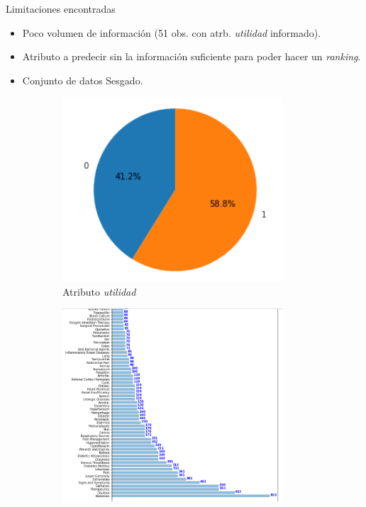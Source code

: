 \documentclass[10pt]{beamer}
\begin{document}
\begin{frame}{Limitaciones encontradas}
  \begin{itemize}
    \item Poco volumen de información (51 obs. con atrb. \textit{utilidad} informado).
    \item Atributo a predecir sin la información suficiente para poder hacer un \textit{ranking}.
    \item Conjunto de datos Sesgado.
  \end{itemize}
  \begin{figure}[!htb]
    \begin{subfigure}[b]{0.45\linewidth}
    	\centering
	    \includegraphics[width=0.9\textwidth]{images/sesgado_1.png}
	    \caption{Atributo \textit{utilidad}}
	\end{subfigure}
	\begin{subfigure}[b]{0.45\linewidth} 
		\centering
		\includegraphics[width=0.9\textwidth]{images/sesgado_2.png}

\end{subfigure}
\end{figure}
\end{frame}
\end{document}
